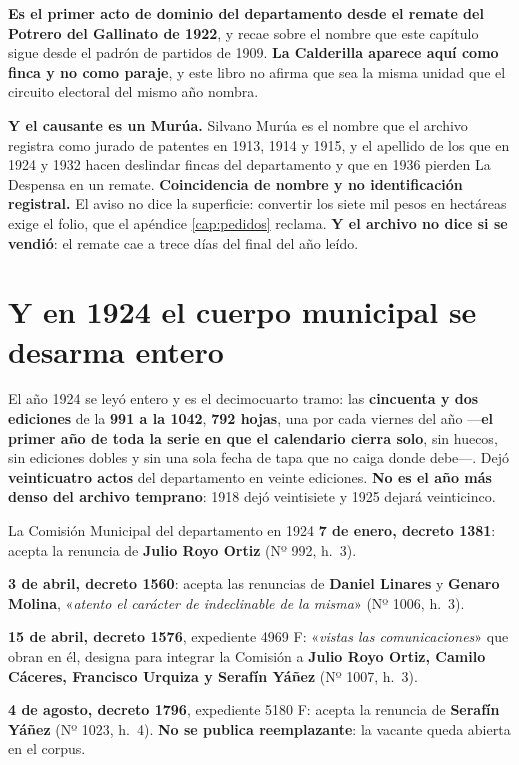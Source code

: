 \begin{cautela}
\textbf{Es el primer acto de dominio del departamento desde el remate del Potrero del Gallinato de 1922}, y recae sobre el nombre que
este capítulo sigue desde el padrón de partidos de 1909. \textbf{La Calderilla aparece aquí como
finca y no como paraje}, y este libro no afirma que sea la misma unidad que el circuito
electoral del mismo año nombra.

\textbf{Y el causante es un Murúa.} Silvano Murúa es el nombre que el archivo registra como
jurado de patentes en 1913, 1914 y 1915, y el apellido de los que en 1924 y 1932 hacen deslindar
fincas del departamento y que en 1936 pierden La Despensa en un remate. \textbf{Coincidencia de
nombre y no identificación registral.} El aviso no dice la superficie: convertir los siete mil
pesos en hectáreas exige el folio, que el apéndice \ref{cap:pedidos} reclama. \textbf{Y el
archivo no dice si se vendió}: el remate cae a trece días del final del año leído.
\end{cautela}

\section{Y en 1924 el cuerpo municipal se desarma entero}

El año 1924 se leyó entero y es el decimocuarto tramo: las \textbf{cincuenta y dos ediciones} de
la \textbf{991 a la 1042}, \textbf{792 hojas}, una por cada viernes del año ---\textbf{el primer
año de toda la serie en que el calendario cierra solo}, sin huecos, sin ediciones dobles y sin
una sola fecha de tapa que no caiga donde debe---. Dejó \textbf{veinticuatro actos} del
departamento en veinte ediciones. \textbf{No es el año más denso del archivo temprano}: 1918 dejó veintisiete y 1925 dejará veinticinco.

\begin{ficha}{La Comisión Municipal del departamento en 1924}
\textbf{7 de enero, decreto 1381}: acepta la renuncia de \textbf{Julio Royo Ortiz} (Nº 992, h.\ 3).

\textbf{3 de abril, decreto 1560}: acepta las renuncias de \textbf{Daniel Linares}
y \textbf{Genaro Molina}, «\textit{atento el carácter de indeclinable de la misma}» (Nº 1006,
h.\ 3).

\textbf{15 de abril, decreto 1576}, expediente 4969 F: «\textit{vistas las comunicaciones}» que
obran en él, designa para integrar la Comisión a \textbf{Julio Royo Ortiz, Camilo Cáceres,
Francisco Urquiza y Serafín Yáñez} (Nº 1007, h.\ 3).

\textbf{4 de agosto, decreto 1796}, expediente 5180 F: acepta la renuncia de \textbf{Serafín
Yáñez} (Nº 1023, h.\ 4). \textbf{No se publica reemplazante}: la vacante queda abierta en el
corpus.
\end{ficha}

